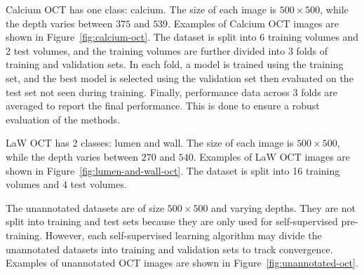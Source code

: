 \documentclass[a4paper,11pt,oneside]{report}
\begin{document}
Calcium OCT has one class: calcium. The size of each image is $500\times 500$, while the depth varies between $375$ and $539$. Examples of Calcium OCT images are shown in Figure~\ref{fig:calcium-oct}. The dataset is split into 6 training volumes and 2 test volumes, and the training volumes are further divided into 3 folds of training and validation sets. In each fold, a model is trained using the training set, and the best model is selected using the validation set then evaluated on the test set not seen during training. Finally, performance data across 3 folds are averaged to report the final performance. This is done to ensure a robust evaluation of the methods.

LaW OCT has 2 classes: lumen and wall. The size of each image is $500\times 500$, while the depth varies between $270$ and $540$. Examples of LaW OCT images are shown in Figure~\ref{fig:lumen-and-wall-oct}. The dataset is split into 16 training volumes and 4 test volumes. 

The unannotated datasets are of size $500\times 500$ and varying depths. They are not split into training and test sets because they are only used for self-supervised pre-training. However, each self-supervised learning algorithm may divide the unannotated datasets into training and validation sets to track convergence. Examples of unannotated OCT images are shown in Figure~\ref{fig:unannotated-oct}.
\end{document}
